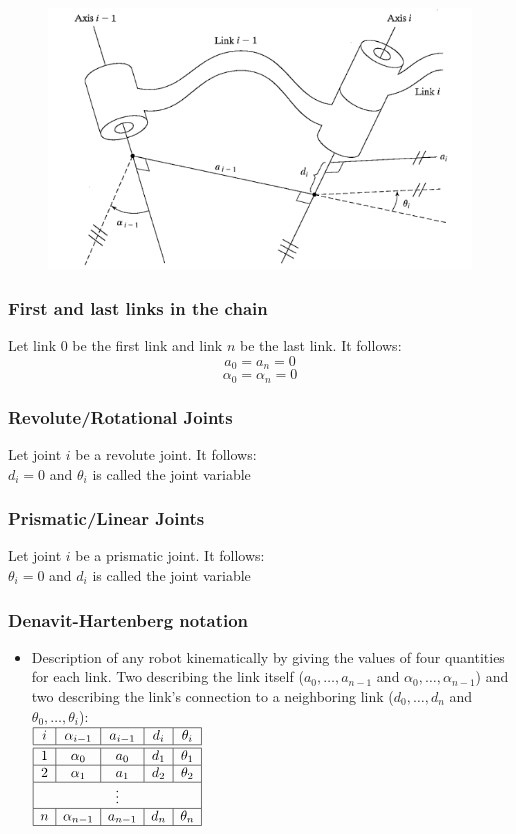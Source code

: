\documentclass[10pt,a4paper]{article}
\begin{document}
\begin{figure}[H]
	\includegraphics[width=0.5\columnwidth]{imgs/link_connection.png}
\end{figure}

\subsubsection{First and last links in the chain}
Let link $0$ be the first link and link $n$ be the last link. It follows: \\
$$
	a_0 = a_n = 0
$$
$$
	\alpha_0 = \alpha_n = 0
$$

\subsubsection{Revolute/Rotational Joints}
Let joint $i$ be a revolute joint. It follows: \\
$d_i = 0$ and $\theta_i$ is called the joint variable

\subsubsection{Prismatic/Linear Joints}
Let joint $i$ be a prismatic joint. It follows: \\
$\theta_i = 0$ and $d_i$ is called the joint variable

\subsubsection{Denavit-Hartenberg notation}
\begin{itemize}
	\item Description of any robot kinematically by giving the values of four quantities for each link. Two describing the link itself ($a_0, \dots, a_{n-1}$ and $\alpha_0, \dots, \alpha_{n-1}$) and two describing the link's connection to a neighboring link ($d_0, \dots, d_n$ and $\theta_0, \dots, \theta_i$): \\
	
	$\begin{array}{|c|c|c|c|c|}
	\hline
		i & \alpha_{i-1} & a_{i-1} & d_i & \theta_i \\
		\hline
		\hline
		1 & \alpha_0 & a_0 & d_1 & \theta_1 \\
		\hline
		2 & \alpha_1 & a_1 & d_2 & \theta_2 \\
		\hline
		\multicolumn{5}{|c|}{\vdots} \\
		\hline
		n & \alpha_{n-1} & a_{n-1} & d_n & \theta_n \\
		\hline
	\end{array}$
\end{itemize}
\end{document}

